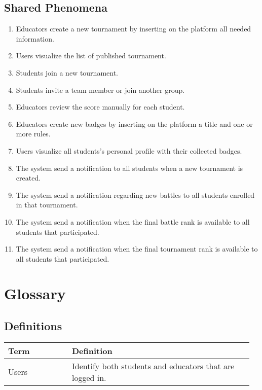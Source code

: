 \subsection{Shared Phenomena}
\begin{enumerate}[label=\textbf{SP.\arabic*}]
        \item Educators create a new tournament by inserting on the platform all needed information.
        \item Users visualize the list of published tournament.
        \item Students join a new tournament.
        \item Students invite a team member or join another group.
	\item Educators review the score manually for each student.
        \item Educators create new badges by inserting on the platform a title and one or more rules.
        \item Users visualize all students's personal profile with their collected badges.
        \item The system send a notification to all students when a new tournament is created.
        \item The system send a notification regarding new battles to all students enrolled in that tournament.
        \item The system send a notification when the final battle rank is available to all students that participated.
        \item The system send a notification when the final tournament rank is available to all students that participated.
\end{enumerate}

\section{Glossary}
\subsection{Definitions}
\begin{center}
	\begin{tabular}{@{}p{0.25\linewidth} p{0.71\linewidth}@{}}
		\toprule
		\textbf{Term} & \textbf{Definition}\\
		\midrule
		Users & Identify both students and educators that are logged in. \\
		\bottomrule
	\end{tabular}
\end{center}


